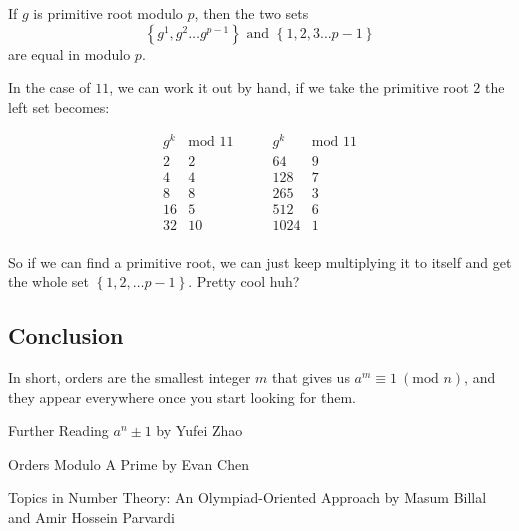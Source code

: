 \documentclass[compress]{beamer}
\newcommand{\gap}{\pause\vspace{1em}}
\begin{document}
\begin{frame}
    \textcolor{NordOrange}{If $g$ is primitive root modulo $p$, then the two
        sets 
        \[\left\{g^1, g^2 \dots g^{p-1}\right\} \text{ and } \left\{1, 2,
        3\dots  p-1\right\}\] 
        are equal in modulo $p$.
    }

    \gap

    In the case of $11$, we can work it out by hand, if we take the primitive
    root $2$ the left set becomes:

    \textcolor{NordBrightBlue}{\[
            \begin{array}{r|r}
                g^k & \text{mod $11$} \\ \hline
                2 & 2 \\
                4 & 4  \\
                8 & 8  \\
                16 & 5 \\
                32 & 10  \\
            \end{array}\qquad
            \begin{array}{r|r}
                g^k & \text{mod $11$} \\ \hline
                64 & 9 \\
                128 & 7  \\
                265 & 3  \\
                512 & 6 \\
                1024 & 1  \\
            \end{array}
    \]}
\end{frame}

\begin{frame}
    So if we can find a primitive root, we can \textcolor{NordRed}{just keep
        multiplying it to itself and get the whole set $\left\{1, 2, \dots
    p-1\right\}$}. Pretty cool huh?
\end{frame}

\subsection{Conclusion}

\begin{frame}
    In short, orders are the smallest integer $m$ that gives us $a^m\equiv 1 \
    (\text{mod } n)$, and they appear everywhere once you start looking for
    them.
\end{frame}

\begin{frame}{Further Reading}
    \textcolor{NordOrange}{$a^n\pm 1$} by Yufei Zhao

    \gap

    \textcolor{NordOrange}{Orders Modulo A Prime} by Evan Chen

    \gap

    \textcolor{NordOrange}{Topics in Number Theory: An Olympiad-Oriented
    Approach} by Masum Billal and Amir Hossein Parvardi
\end{frame}
\end{document}

